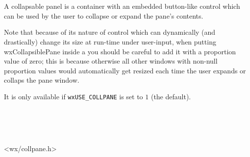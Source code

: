 
\section{}\label{wxcollapsiblepane}

A collapsable panel is a container with an embedded button-like control which can be
used by the user to collapse or expand the pane's contents.

Note that because of its nature of control which can dynamically (and drastically)
change its size at run-time under user-input, when putting wxCollapsiblePane inside
a  you should be careful to add it with a proportion value
of zero; this is because otherwise all other windows with non-null proportion values
would automatically get resized each time the user expands or collaps the pane window.

It is only available if \texttt{wxUSE\_COLLPANE} is set to $1$ (the default).


\\
\\
\\


<wx/collpane.h>


\twocolwidtha{5cm}%
\begin{twocollist}\itemsep=0pt
\end{twocollist}


\twocolwidtha{7cm}%
\begin{twocollist}\itemsep=0pt
\end{twocollist}


